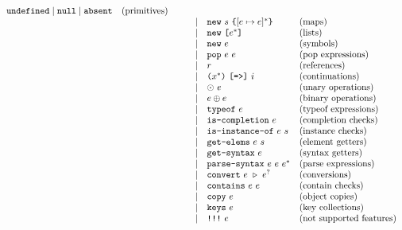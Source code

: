 \[\begin{array}{lrclrll}
          \C{undefined} \mid \C{null} \mid \C{absent}           & \text{(primitives)}\\
    &&&&\mid& \C{new}\ \str\ \C{\{}[\expr \mapsto \expr]^*\C{\}}& \text{(maps)}\\
    &&&&\mid& \C{new}\ \C{[} \expr^* \C{]}                      & \text{(lists)}\\
    &&&&\mid& \C{new}\ \expr                                    & \text{(symbols)}\\
    &&&&\mid& \C{pop}\ \expr\ \expr                             & \text{(pop expressions)}\\
    &&&&\mid& \refer                                            & \text{(references)}\\
    &&&&\mid& \C{(} \id^* \C{)}\ \C{[=>]}\ \inst                & \text{(continuations)}\\
    &&&&\mid& \uop\ \expr                                       & \text{(unary operations)}\\
    &&&&\mid& \expr \bop \expr                                  & \text{(binary operations)}\\
    &&&&\mid& \C{typeof}\ \expr                                 & \text{(typeof expressions)}\\
    &&&&\mid& \C{is-completion}\ \expr                          & \text{(completion checks)}\\
    &&&&\mid& \C{is-instance-of}\ \expr\ \str                   & \text{(instance checks)}\\
    &&&&\mid& \C{get-elems}\ \expr\ \str                        & \text{(element getters)}\\
    &&&&\mid& \C{get-syntax}\ \expr                             & \text{(syntax getters)}\\
    &&&&\mid& \C{parse-syntax}\ \expr\ \expr\ \expr^*           & \text{(parse expressions)}\\
    &&&&\mid& \C{convert}\ \expr\ \cop\ \expr^?                 & \text{(conversions)}\\
    &&&&\mid& \C{contains}\ \expr\ \expr                        & \text{(contain checks)}\\
    &&&&\mid& \C{copy}\ \expr                                   & \text{(object copies)}\\
    &&&&\mid& \C{keys}\ \expr                                   & \text{(key collections)}\\
    &&&&\mid& \C{!!!}\ \expr                                    & \text{(not supported features)}\\
  \end{array}
\]

